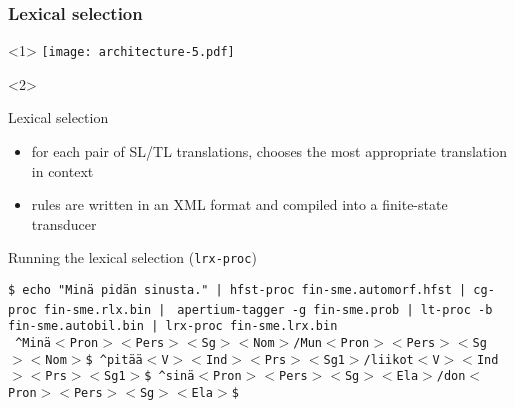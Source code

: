 \documentclass[10pt,xetex]{beamer} %
\begin{document}
\begin{frame}
  \frametitle{Lexical selection} %

\begin{onlyenv}<1>
\texttt{[image: architecture-5.pdf]}
\end{onlyenv}
\begin{onlyenv}<2>

 \begin{block}{Lexical selection}
  \begin{itemize}
 \item for each pair of SL/TL translations, chooses the most appropriate translation in context
 \item rules are written in an XML format and compiled into a finite-state transducer
  \end{itemize}
  \end{block}
  \begin{block}{Running the lexical selection ({\tt lrx-proc})} %
  \begin{small}
    \texttt{\$ echo "Minä pidän sinusta." | hfst-proc fin-sme.automorf.hfst | cg-proc fin-sme.rlx.bin |}
    \texttt{  apertium-tagger -g fin-sme.prob | lt-proc -b fin-sme.autobil.bin | lrx-proc fin-sme.lrx.bin}\\
    \texttt{ \^{}Minä$<$Pron$><$Pers$><$Sg$><$Nom$>$/Mun$<$Pron$><$Pers$><$Sg$><$Nom$>$\$ \^{}pitää$<$V$><$Ind$><$Prs$><$Sg1$>$/liikot$<$V$><$Ind$><$Prs$><$Sg1$>$\$ \^{}sinä$<$Pron$><$Pers$><$Sg$><$Ela$>$/don$<$Pron$><$Pers$><$Sg$><$Ela$>$\$ }
  \end{small}
  \end{block}
\end{onlyenv}
\end{frame}
\end{document}
